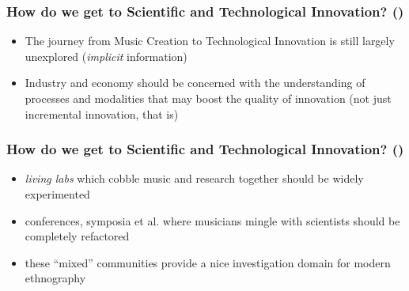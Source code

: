 \setcounter{ms}{0}
\begin{frame}
		\frametitle<+- | alert@+->{How do we get to Scientific and Technological Innovation? ()}

    \begin{itemize}[<+- | alert@+->]
				\item The journey from Music Creation to Technological Innovation
								is still largely unexplored (\emph{implicit} information)
        \item Industry and economy should be concerned with the understanding
								of processes and modalities that may boost the quality of
								innovation (not just incremental innovation, that is)
    \end{itemize}
    
\end{frame}

\begin{frame}
		\frametitle<+- | alert@+->{How do we get to Scientific and Technological Innovation? ()}

    \begin{itemize}[<+- | alert@+->]
				\item \emph{living labs} which cobble music and research together
								should be widely experimented
				\item conferences, symposia et al. where musicians mingle with
								scientists should be completely refactored
				\item these ``mixed'' communities provide a nice investigation domain
								for modern ethnography
    \end{itemize}
    
\end{frame}

